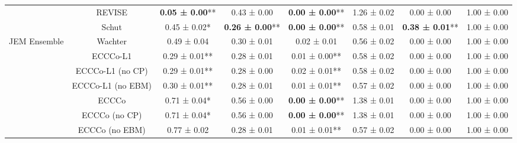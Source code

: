 \begin{table}
{\begin{tabular}[t]{cccccccc}
 & REVISE & \textbf{0.05 ± 0.00}** & 0.43 ± 0.00\hphantom{*}\hphantom{*} & \textbf{0.00 ± 0.00}** & 1.26 ± 0.02\hphantom{*}\hphantom{*} & 0.00 ± 0.00\hphantom{*}\hphantom{*} & 1.00 ± 0.00\hphantom{*}\hphantom{*}\\

 & Schut & 0.45 ± 0.02*\hphantom{*} & \textbf{0.26 ± 0.00}** & \textbf{0.00 ± 0.00}** & 0.58 ± 0.01\hphantom{*}\hphantom{*} & \textbf{0.38 ± 0.01}** & 1.00 ± 0.00\hphantom{*}\hphantom{*}\\

\multirow[t]{-9}{*}{\centering\arraybackslash JEM Ensemble} & Wachter & 0.49 ± 0.04\hphantom{*}\hphantom{*} & 0.30 ± 0.01\hphantom{*}\hphantom{*} & 0.02 ± 0.01\hphantom{*}\hphantom{*} & 0.56 ± 0.02\hphantom{*}\hphantom{*} & 0.00 ± 0.00\hphantom{*}\hphantom{*} & 1.00 ± 0.00\hphantom{*}\hphantom{*}\\
\cmidrule{1-8}
 & ECCCo-L1 & 0.29 ± 0.01** & 0.28 ± 0.01\hphantom{*}\hphantom{*} & 0.01 ± 0.00** & 0.58 ± 0.02\hphantom{*}\hphantom{*} & 0.00 ± 0.00\hphantom{*}\hphantom{*} & 1.00 ± 0.00\hphantom{*}\hphantom{*}\\

 & ECCCo-L1 (no CP) & 0.29 ± 0.01** & 0.28 ± 0.00\hphantom{*}\hphantom{*} & 0.02 ± 0.01** & 0.58 ± 0.02\hphantom{*}\hphantom{*} & 0.00 ± 0.00\hphantom{*}\hphantom{*} & 1.00 ± 0.00\hphantom{*}\hphantom{*}\\

 & ECCCo-L1 (no EBM) & 0.30 ± 0.01** & 0.28 ± 0.01\hphantom{*}\hphantom{*} & 0.01 ± 0.01** & 0.57 ± 0.02\hphantom{*}\hphantom{*} & 0.00 ± 0.00\hphantom{*}\hphantom{*} & 1.00 ± 0.00\hphantom{*}\hphantom{*}\\

 & ECCCo & 0.71 ± 0.04*\hphantom{*} & 0.56 ± 0.00\hphantom{*}\hphantom{*} & \textbf{0.00 ± 0.00}** & 1.38 ± 0.01\hphantom{*}\hphantom{*} & 0.00 ± 0.00\hphantom{*}\hphantom{*} & 1.00 ± 0.00\hphantom{*}\hphantom{*}\\

 & ECCCo (no CP) & 0.71 ± 0.04*\hphantom{*} & 0.56 ± 0.00\hphantom{*}\hphantom{*} & \textbf{0.00 ± 0.00}** & 1.38 ± 0.01\hphantom{*}\hphantom{*} & 0.00 ± 0.00\hphantom{*}\hphantom{*} & 1.00 ± 0.00\hphantom{*}\hphantom{*}\\

 & ECCCo (no EBM) & 0.77 ± 0.02\hphantom{*}\hphantom{*} & 0.28 ± 0.01\hphantom{*}\hphantom{*} & 0.01 ± 0.01** & 0.57 ± 0.02\hphantom{*}\hphantom{*} & 0.00 ± 0.00\hphantom{*}\hphantom{*} & 1.00 ± 0.00\hphantom{*}\hphantom{*}\\


\end{tabular}}
\end{table}
